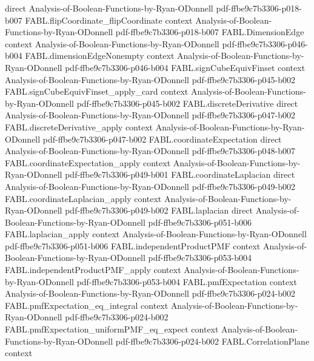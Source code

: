 \begin{theorem}
  {direct}
  {Analysis-of-Boolean-Functions-by-Ryan-ODonnell}
  {pdf-ffbe9c7b3306-p018-b007}
\proofstep
  {FABL.flipCoordinate_flipCoordinate}
  {context}
  {Analysis-of-Boolean-Functions-by-Ryan-ODonnell}
  {pdf-ffbe9c7b3306-p018-b007}
\proofstep
  {FABL.DimensionEdge}
  {context}
  {Analysis-of-Boolean-Functions-by-Ryan-ODonnell}
  {pdf-ffbe9c7b3306-p046-b004}
\proofstep
  {FABL.dimensionEdgeNonempty}
  {context}
  {Analysis-of-Boolean-Functions-by-Ryan-ODonnell}
  {pdf-ffbe9c7b3306-p046-b004}
\proofstep
  {FABL.signCubeEquivFinset}
  {context}
  {Analysis-of-Boolean-Functions-by-Ryan-ODonnell}
  {pdf-ffbe9c7b3306-p045-b002}
\proofstep
  {FABL.signCubeEquivFinset_apply_card}
  {context}
  {Analysis-of-Boolean-Functions-by-Ryan-ODonnell}
  {pdf-ffbe9c7b3306-p045-b002}
\proofstep
  {FABL.discreteDerivative}
  {direct}
  {Analysis-of-Boolean-Functions-by-Ryan-ODonnell}
  {pdf-ffbe9c7b3306-p047-b002}
\proofstep
  {FABL.discreteDerivative_apply}
  {context}
  {Analysis-of-Boolean-Functions-by-Ryan-ODonnell}
  {pdf-ffbe9c7b3306-p047-b002}
\proofstep
  {FABL.coordinateExpectation}
  {direct}
  {Analysis-of-Boolean-Functions-by-Ryan-ODonnell}
  {pdf-ffbe9c7b3306-p048-b007}
\proofstep
  {FABL.coordinateExpectation_apply}
  {context}
  {Analysis-of-Boolean-Functions-by-Ryan-ODonnell}
  {pdf-ffbe9c7b3306-p049-b001}
\proofstep
  {FABL.coordinateLaplacian}
  {direct}
  {Analysis-of-Boolean-Functions-by-Ryan-ODonnell}
  {pdf-ffbe9c7b3306-p049-b002}
\proofstep
  {FABL.coordinateLaplacian_apply}
  {context}
  {Analysis-of-Boolean-Functions-by-Ryan-ODonnell}
  {pdf-ffbe9c7b3306-p049-b002}
\proofstep
  {FABL.laplacian}
  {direct}
  {Analysis-of-Boolean-Functions-by-Ryan-ODonnell}
  {pdf-ffbe9c7b3306-p051-b006}
\proofstep
  {FABL.laplacian_apply}
  {context}
  {Analysis-of-Boolean-Functions-by-Ryan-ODonnell}
  {pdf-ffbe9c7b3306-p051-b006}
\proofstep
  {FABL.independentProductPMF}
  {context}
  {Analysis-of-Boolean-Functions-by-Ryan-ODonnell}
  {pdf-ffbe9c7b3306-p053-b004}
\proofstep
  {FABL.independentProductPMF_apply}
  {context}
  {Analysis-of-Boolean-Functions-by-Ryan-ODonnell}
  {pdf-ffbe9c7b3306-p053-b004}
\proofstep
  {FABL.pmfExpectation}
  {context}
  {Analysis-of-Boolean-Functions-by-Ryan-ODonnell}
  {pdf-ffbe9c7b3306-p024-b002}
\proofstep
  {FABL.pmfExpectation_eq_integral}
  {context}
  {Analysis-of-Boolean-Functions-by-Ryan-ODonnell}
  {pdf-ffbe9c7b3306-p024-b002}
\proofstep
  {FABL.pmfExpectation_uniformPMF_eq_expect}
  {context}
  {Analysis-of-Boolean-Functions-by-Ryan-ODonnell}
  {pdf-ffbe9c7b3306-p024-b002}
\proofstep
  {FABL.CorrelationPlane}
  {context}

\end{theorem}
